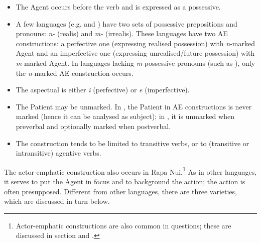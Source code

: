 \begin{itemize}
\item 
The Agent occurs before the verb and is expressed as a possessive. 

\item 
A few languages (e.g.  and ) have two sets of possessive prepositions and pronouns: \textit{n-} (realis) and \textit{m-} (irrealis). These languages have two AE constructions: a perfective one (expressing realised possession) with \textit{n}{}-marked Agent and an imperfective one (expressing unrealised/future possession) with \textit{m}{}-marked Agent. In languages lacking \textit{m}{}-possessive pronouns (such as ), only the \textit{n}{}-marked AE construction occurs.

\item 
The aspectual is either \textit{i} (perfective) or \textit{e} (imperfective).

\item 
The Patient may be unmarked. In , the Patient in AE constructions is never marked (hence it can be analysed as subject); in , it is unmarked when preverbal and optionally marked when postverbal.

\item 
The construction tends to be limited to transitive verbs, or to (transitive or intransitive) agentive verbs.

\end{itemize}

The actor-emphatic construction also occurs in Rapa Nui.\footnote{\label{fn:429}Actor-emphatic constructions are also common in questions; these are discussed in section  and .} As in other languages, it serves to put the Agent in focus and to background the action; the action is often presupposed. Different from other languages, there are three varieties, which are discussed in turn below.

